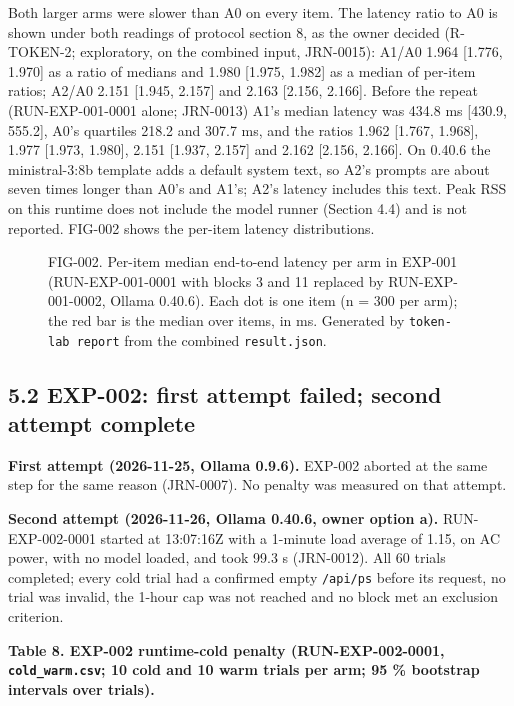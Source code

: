 \documentclass[
]{article}
\makeatletter
\newcommand*\pandocbounded[1]{%
  \sbox\pandoc@box{#1}%
  \Gscale@div\@tempa{\textheight}{\dimexpr\ht\pandoc@box+\dp\pandoc@box\relax}%
  \Gscale@div\@tempb{\linewidth}{\wd\pandoc@box}%
  \ifdim\@tempb\p@<\@tempa\p@\let\@tempa\@tempb\fi%
  \ifdim\@tempa\p@<\p@\scalebox{\@tempa}{\usebox\pandoc@box}%
  \else\usebox{\pandoc@box}%
  \fi%
}
\makeatother
\begin{document}
Both larger arms were slower than A0 on every item. The latency ratio to
A0 is shown under both readings of protocol section 8, as the owner
decided (R-TOKEN-2; exploratory, on the combined input, JRN-0015): A1/A0
1.964 {[}1.776, 1.970{]} as a ratio of medians and 1.980 {[}1.975,
1.982{]} as a median of per-item ratios; A2/A0 2.151 {[}1.945, 2.157{]}
and 2.163 {[}2.156, 2.166{]}. Before the repeat (RUN-EXP-001-0001 alone;
JRN-0013) A1's median latency was 434.8 ms {[}430.9, 555.2{]}, A0's
quartiles 218.2 and 307.7 ms, and the ratios 1.962 {[}1.767, 1.968{]},
1.977 {[}1.973, 1.980{]}, 2.151 {[}1.937, 2.157{]} and 2.162 {[}2.156,
2.166{]}. On 0.40.6 the ministral-3:8b template adds a default system
text, so A2's prompts are about seven times longer than A0's and A1's;
A2's latency includes this text. Peak RSS on this runtime does not
include the model runner (Section 4.4) and is not reported. FIG-002
shows the per-item latency distributions.

\begin{figure}
\centering
\pandocbounded{}
\caption{FIG-002. Per-item median end-to-end latency per arm in EXP-001
(RUN-EXP-001-0001 with blocks 3 and 11 replaced by RUN-EXP-001-0002,
Ollama 0.40.6). Each dot is one item (n = 300 per arm); the red bar is
the median over items, in ms. Generated by \texttt{token-lab\ report}
from the combined \texttt{result.json}.}
\end{figure}

\subsection{5.2 EXP-002: first attempt failed; second attempt
complete}\label{exp-002-first-attempt-failed-second-attempt-complete}

\textbf{First attempt (2026-11-25, Ollama 0.9.6).} EXP-002 aborted at
the same step for the same reason (JRN-0007). No penalty was measured on
that attempt.

\textbf{Second attempt (2026-11-26, Ollama 0.40.6, owner option a).}
RUN-EXP-002-0001 started at 13:07:16Z with a 1-minute load average of
1.15, on AC power, with no model loaded, and took 99.3 s (JRN-0012). All
60 trials completed; every cold trial had a confirmed empty
\texttt{/api/ps} before its request, no trial was invalid, the 1-hour
cap was not reached and no block met an exclusion criterion.

\textbf{Table 8. EXP-002 runtime-cold penalty (RUN-EXP-002-0001,
\texttt{cold\_warm.csv}; 10 cold and 10 warm trials per arm; 95 \%
bootstrap intervals over trials).}
\end{document}
